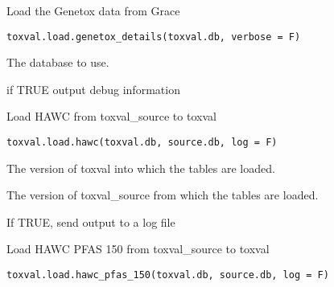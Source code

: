 \documentclass[letterpaper]{book}
\begin{document}
%
\begin{Description}\relax
Load the Genetox data from Grace
\end{Description}
%
\begin{Usage}
\begin{verbatim}
toxval.load.genetox_details(toxval.db, verbose = F)
\end{verbatim}
\end{Usage}
%
\begin{Arguments}
\begin{ldescription}
\item[\code{toxval.db}] The database to use.

\item[\code{verbose}] if TRUE output debug information
\end{ldescription}
\end{Arguments}
%
\begin{Description}\relax
Load HAWC from toxval\_source to toxval
\end{Description}
%
\begin{Usage}
\begin{verbatim}
toxval.load.hawc(toxval.db, source.db, log = F)
\end{verbatim}
\end{Usage}
%
\begin{Arguments}
\begin{ldescription}
\item[\code{toxval.db}] The version of toxval into which the tables are loaded.

\item[\code{source.db}] The version of toxval\_source from which the tables are loaded.

\item[\code{log}] If TRUE, send output to a log file
\end{ldescription}
\end{Arguments}
%
\begin{Description}\relax
Load HAWC PFAS 150 from toxval\_source to toxval
\end{Description}
%
\begin{Usage}
\begin{verbatim}
toxval.load.hawc_pfas_150(toxval.db, source.db, log = F)
\end{verbatim}
\end{Usage}
\end{document}
